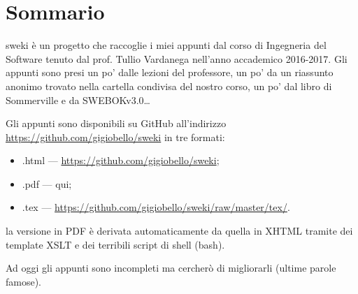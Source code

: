 \section{Sommario}
sweki è un progetto che raccoglie i miei appunti dal corso di Ingegneria del Software tenuto dal prof. Tullio Vardanega nell'anno accademico 2016-2017. Gli appunti sono presi un po' dalle lezioni del professore, un po' da un riassunto anonimo trovato nella cartella condivisa del nostro corso, un po' dal libro di Sommerville e da SWEBOKv3.0\dots

Gli appunti sono disponibili su GitHub all'indirizzo \url{https://github.com/gigiobello/sweki} in tre formati:
\begin{itemize}
	\item .html --- \url{https://github.com/gigiobello/sweki};
	\item .pdf --- qui;
	\item .tex --- \url{https://github.com/gigiobello/sweki/raw/master/tex/}.
\end{itemize}

la versione in PDF è derivata automaticamente da quella in XHTML tramite dei template XSLT e dei terribili script di shell (bash).

Ad oggi gli appunti sono incompleti ma cercherò di migliorarli (ultime parole famose).

